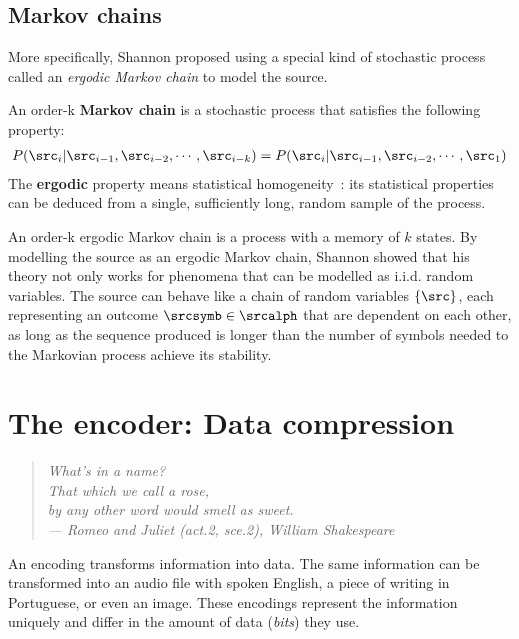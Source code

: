 \subsection{Markov chains} More specifically, Shannon proposed using a special kind of stochastic process called an \emph{ergodic Markov chain} to model the source.
\begin{definition}
	An order-k \textbf{Markov chain} is a stochastic process that satisfies the following property:
	\begin{align}
		P(\src_i|\src_{i-1}, \src_{i-2}, \cdots, \src_{i-k})=P(\src_i|\src_{i-1}, \src_{i-2}, \cdots, \src_1)
	\end{align}
	The \textbf{ergodic} property means statistical homogeneity~\cite{shannon:1949}: its statistical properties can be deduced from a single, sufficiently long, random sample of the process.

\end{definition}
An order-k ergodic Markov chain is a process with a memory of \(k\) states. By modelling the source as an ergodic Markov chain, Shannon showed that his theory not only works for phenomena that can be modelled as i.i.d. random variables. The source can behave like a chain of random variables \( \{\src\}\), each representing an outcome \(\srcsymb \in \srcalph\) that are dependent on each other, as long as the sequence produced is longer than the number of symbols needed to the Markovian process achieve its stability.


\section{The encoder: Data compression}
\begin{quotation}
	\small \emph{ \flushright What’s in a name? \\
That which we call a rose,\\
by any other word would smell as sweet.\\
	\flushright --- Romeo and Juliet (act.2, sce.2), William Shakespeare\\
	\vspace{1cm} }
\end{quotation}
An encoding transforms information into data. The same information can be transformed into an audio file with spoken English, a piece of writing in Portuguese, or even an image. These encodings represent the information uniquely and differ in the amount of data (\emph{bits}) they use.

